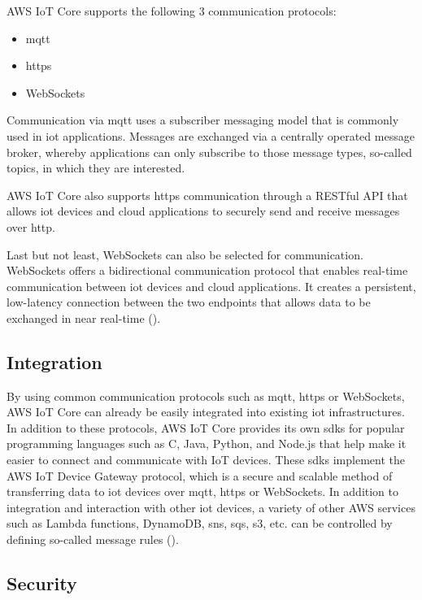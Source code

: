 AWS IoT Core supports the following 3 communication protocols:

\begin{itemize}
    \item \ac{mqtt}
    \item \ac{https}
    \item WebSockets
\end{itemize}
Communication via \ac{mqtt} uses a subscriber messaging model that is commonly used in \ac{iot} applications. 
Messages are exchanged via a centrally operated message broker, whereby applications can only subscribe to those message types, so-called topics, in which they are interested.

AWS IoT Core also supports \ac{https} communication through a RESTful API that allows \ac{iot} devices and cloud applications to securely send and receive messages over \ac{http}.

Last but not least, WebSockets can also be selected for communication. WebSockets offers a bidirectional communication protocol that enables real-time communication between \ac{iot} devices and cloud applications. 
It creates a persistent, low-latency connection between the two endpoints that allows data to be exchanged in near real-time ({\cite{ref02}}).

\subsection{Integration}

By using common communication protocols such as \ac{mqtt}, \ac{https} or WebSockets, AWS IoT Core can already be easily integrated into existing \ac{iot} infrastructures. 
In addition to these protocols, AWS IoT Core provides its own \ac{sdk}s for popular programming languages such as C, Java, Python, and Node.js that help make it easier to connect and communicate with IoT devices. 
These \ac{sdk}s implement the AWS IoT Device Gateway protocol, which is a secure and scalable method of transferring data to \ac{iot} devices over \ac{mqtt}, \ac{https} or WebSockets.
In addition to integration and interaction with other \ac{iot} devices, a variety of other AWS services such as Lambda functions, DynamoDB, \ac{sns}, \ac{sqs}, \ac{s3}, etc. can be controlled by defining so-called message rules (\cite{RefAwsIotCoreFeatures}).

\subsection{Security}

